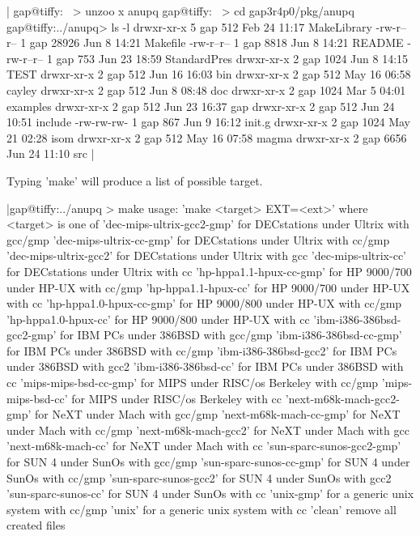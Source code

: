 |    gap@tiffy:~ > unzoo x anupq
    gap@tiffy:~ > cd gap3r4p0/pkg/anupq
    gap@tiffy:../anupq> ls -l
    drwxr-xr-x  5 gap       512 Feb 24 11:17 MakeLibrary
    -rw-r--r--  1 gap     28926 Jun  8 14:21 Makefile
    -rw-r--r--  1 gap      8818 Jun  8 14:21 README
    -rw-r--r--  1 gap       753 Jun 23 18:59 StandardPres
    drwxr-xr-x  2 gap      1024 Jun  8 14:15 TEST
    drwxr-xr-x  2 gap       512 Jun 16 16:03 bin
    drwxr-xr-x  2 gap       512 May 16 06:58 cayley
    drwxr-xr-x  2 gap       512 Jun  8 08:48 doc
    drwxr-xr-x  2 gap      1024 Mar  5 04:01 examples
    drwxr-xr-x  2 gap       512 Jun 23 16:37 gap
    drwxr-xr-x  2 gap       512 Jun 24 10:51 include
    -rw-rw-rw-  1 gap       867 Jun  9 16:12 init.g
    drwxr-xr-x  2 gap      1024 May 21 02:28 isom
    drwxr-xr-x  2 gap       512 May 16 07:58 magma
    drwxr-xr-x  2 gap      6656 Jun 24 11:10 src |

Typing 'make' will produce a list of possible target.

|gap@tiffy:../anupq > make
usage: 'make <target> EXT=<ext>'  where <target> is one of
'dec-mips-ultrix-gcc2-gmp' for DECstations under Ultrix with gcc/gmp
'dec-mips-ultrix-cc-gmp'   for DECstations under Ultrix with cc/gmp
'dec-mips-ultrix-gcc2'     for DECstations under Ultrix with gcc
'dec-mips-ultrix-cc'       for DECstations under Ultrix with cc
'hp-hppa1.1-hpux-cc-gmp'   for HP 9000/700 under HP-UX with cc/gmp
'hp-hppa1.1-hpux-cc'       for HP 9000/700 under HP-UX with cc
'hp-hppa1.0-hpux-cc-gmp'   for HP 9000/800 under HP-UX with cc/gmp
'hp-hppa1.0-hpux-cc'       for HP 9000/800 under HP-UX with cc
'ibm-i386-386bsd-gcc2-gmp' for IBM PCs under 386BSD with gcc/gmp
'ibm-i386-386bsd-cc-gmp'   for IBM PCs under 386BSD with cc/gmp
'ibm-i386-386bsd-gcc2'     for IBM PCs under 386BSD with gcc2
'ibm-i386-386bsd-cc'       for IBM PCs under 386BSD with cc
'mips-mips-bsd-cc-gmp'     for MIPS under RISC/os Berkeley with cc/gmp
'mips-mips-bsd-cc'         for MIPS under RISC/os Berkeley with cc
'next-m68k-mach-gcc2-gmp'  for NeXT under Mach with gcc/gmp
'next-m68k-mach-cc-gmp'    for NeXT under Mach with cc/gmp
'next-m68k-mach-gcc2'      for NeXT under Mach with gcc
'next-m68k-mach-cc'        for NeXT under Mach with cc
'sun-sparc-sunos-gcc2-gmp' for SUN 4 under SunOs with gcc/gmp
'sun-sparc-sunos-cc-gmp'   for SUN 4 under SunOs with cc/gmp
'sun-sparc-sunos-gcc2'     for SUN 4 under SunOs with gcc2
'sun-sparc-sunos-cc'       for SUN 4 under SunOs with cc
'unix-gmp'                 for a generic unix system with cc/gmp
'unix'                     for a generic unix system with cc
'clean'                    remove all created files

